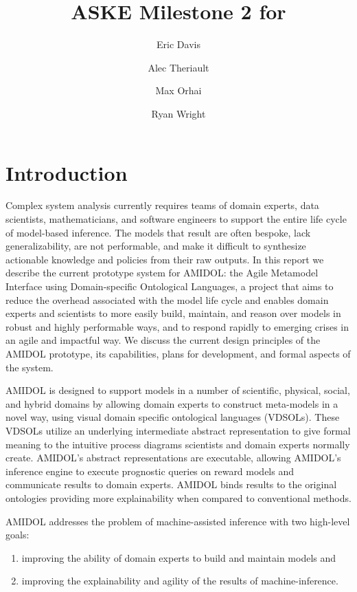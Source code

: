 \documentclass[11pt]{article}
\date{\vspace{-5ex}}
\author[1]{Eric Davis}
\author[1]{Alec Theriault}
\author[1]{Max Orhai}
\author[1]{Ryan Wright}
\affil[1]{Galois, Inc}
\title{ASKE Milestone 2 for \amidol{}}
\newcommand{\amidol}{\textsc{AMIDOL}}
\begin{document}
\maketitle
\vspace{10pt}

\section{Introduction}

Complex system analysis currently requires teams of domain experts, data scientists, mathematicians, and software engineers to support the entire life cycle of model-based inference.  The models that result are often bespoke, lack generalizability, are not performable, and make it difficult to synthesize actionable knowledge and policies from their raw outputs.  In this report we describe the current prototype system for \amidol{}: the Agile Metamodel Interface using Domain-specific Ontological Languages, a project that aims to reduce the overhead associated with the model life cycle and enables domain experts and scientists to more easily build, maintain, and reason over models in robust and highly performable ways, and to respond rapidly to emerging crises in an agile and impactful way.  We discuss the current design principles of the \amidol{} prototype, its capabilities, plans for development, and formal aspects of the system.

\amidol{} is designed to support models in a number of scientific, physical, social, and hybrid domains by allowing domain experts to construct meta-models in a novel way, using visual domain specific ontological languages (VDSOLs).  These VDSOLs utilize an underlying intermediate abstract representation to give formal meaning to the intuitive process diagrams scientists and domain experts normally create.  \amidol{}'s abstract representations are executable, allowing \amidol{}'s inference engine to execute prognostic queries on reward models and communicate results to domain experts. \amidol{} binds results to the original ontologies providing more explainability when compared to conventional methods.

\amidol{} addresses the problem of machine-assisted inference with two high-level goals:

\begin{enumerate}
\item improving the ability of domain experts to build and maintain models and
\item improving the explainability and agility of the results of machine-inference.
\end{enumerate}
\end{document}
